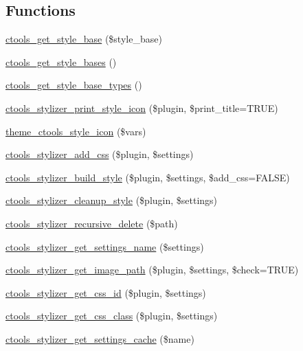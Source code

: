 \subsection*{Functions}
\begin{DoxyCompactItemize}
\item 
\hyperlink{includes_2stylizer_8inc_a658801d5f944d817d7708fc74896f4ff}{ctools\_\-get\_\-style\_\-base} (\$style\_\-base)
\item 
\hyperlink{includes_2stylizer_8inc_ac3b4248ca3d32e0c3c2e1d41eb82ba08}{ctools\_\-get\_\-style\_\-bases} ()
\item 
\hyperlink{includes_2stylizer_8inc_afa58bf443f571c853346d908d15e62c1}{ctools\_\-get\_\-style\_\-base\_\-types} ()
\item 
\hyperlink{includes_2stylizer_8inc_af18de8af7efd4c7d25353101f67552d7}{ctools\_\-stylizer\_\-print\_\-style\_\-icon} (\$plugin, \$print\_\-title=TRUE)
\item 
\hyperlink{includes_2stylizer_8inc_a1510c1f74e2722976f9b2703d766540b}{theme\_\-ctools\_\-style\_\-icon} (\$vars)
\item 
\hyperlink{includes_2stylizer_8inc_a35692d99bf23f2c31521807f0b197c6c}{ctools\_\-stylizer\_\-add\_\-css} (\$plugin, \$settings)
\item 
\hyperlink{includes_2stylizer_8inc_a9bb576123a71e881578bece05f98bbcf}{ctools\_\-stylizer\_\-build\_\-style} (\$plugin, \$settings, \$add\_\-css=FALSE)
\item 
\hyperlink{includes_2stylizer_8inc_a2f95e8f0fa28bb411d149593c8fbe1e1}{ctools\_\-stylizer\_\-cleanup\_\-style} (\$plugin, \$settings)
\item 
\hyperlink{includes_2stylizer_8inc_a7d07ec4721d2c7c439f7daa904c63237}{ctools\_\-stylizer\_\-recursive\_\-delete} (\$path)
\item 
\hyperlink{includes_2stylizer_8inc_a51b57618f1b4645dc9be0c1156ce0fbc}{ctools\_\-stylizer\_\-get\_\-settings\_\-name} (\$settings)
\item 
\hyperlink{includes_2stylizer_8inc_ae48648f40a99667c1b8bbfda187f69fb}{ctools\_\-stylizer\_\-get\_\-image\_\-path} (\$plugin, \$settings, \$check=TRUE)
\item 
\hyperlink{includes_2stylizer_8inc_acacf8de6ab55ca1c52fd88b9aef8559b}{ctools\_\-stylizer\_\-get\_\-css\_\-id} (\$plugin, \$settings)
\item 
\hyperlink{includes_2stylizer_8inc_a4c5d78d1561824bb9c1a6ca84fe79368}{ctools\_\-stylizer\_\-get\_\-css\_\-class} (\$plugin, \$settings)
\item 
\hyperlink{includes_2stylizer_8inc_a92cca1a6bea307b8086a08909f909d40}{ctools\_\-stylizer\_\-get\_\-settings\_\-cache} (\$name)

\end{DoxyCompactItemize}
